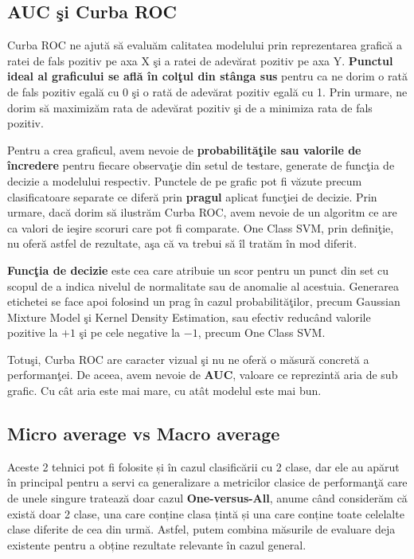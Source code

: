 \subsection{AUC şi Curba ROC}

Curba ROC ne ajută să evaluăm calitatea modelului prin reprezentarea grafică 
a ratei de fals pozitiv pe axa X şi a ratei de adevărat pozitiv pe axa Y. 
\textbf{Punctul 
ideal al graficului se află în colţul din stânga sus} pentru ca ne dorim o 
rată de fals pozitiv egală cu 0 şi o rată de adevărat pozitiv egală cu 1. Prin urmare,
ne dorim să maximizăm rata de adevărat pozitiv şi de a minimiza rata de fals pozitiv.

Pentru a crea graficul, avem nevoie de \textbf{probabilităţile sau valorile de încredere} 
pentru fiecare observaţie din setul de  testare, generate de funcţia de decizie a 
modelului respectiv. Punctele de pe grafic pot fi văzute precum clasificatoare 
separate ce diferă prin \textbf{pragul} aplicat funcţiei de decizie. Prin urmare, dacă
dorim să ilustrăm Curba ROC, avem nevoie de un algoritm ce are ca valori de ieşire
scoruri care pot fi comparate. One Class SVM, prin definiţie, nu oferă astfel de 
rezultate, aşa că va trebui să îl tratăm în mod diferit.

\textbf{Funcţia de decizie} este cea care atribuie un scor pentru 
un punct din set cu scopul de a indica nivelul de normalitate sau de anomalie 
al acestuia. Generarea etichetei se face apoi folosind un prag în cazul 
probabilităţilor, precum Gaussian Mixture Model şi Kernel Density Estimation, 
sau efectiv reducând valorile pozitive la $+1$ şi pe cele negative la $-1$,
precum One Class SVM.

Totuşi, Curba ROC are caracter vizual şi nu ne oferă o măsură concretă a performanţei.
De aceea, avem nevoie de \textbf{AUC}, valoare ce reprezintă aria de sub grafic. Cu cât aria
este mai mare, cu atât modelul este mai bun.

\subsection{Micro average vs Macro average}

Aceste 2 tehnici pot fi folosite și în cazul clasificării cu 2 clase, dar 
ele au apărut în principal pentru a servi ca generalizare a metricilor 
clasice de performanţă care de unele singure tratează 
doar cazul \textbf{One-versus-All}, anume 
când considerăm că există doar 2 clase,
una care conține clasa țintă și una care 
conține toate celelalte clase diferite de cea din urmă. Astfel, putem 
combina măsurile de evaluare deja existente pentru a obține 
rezultate relevante în cazul general.

